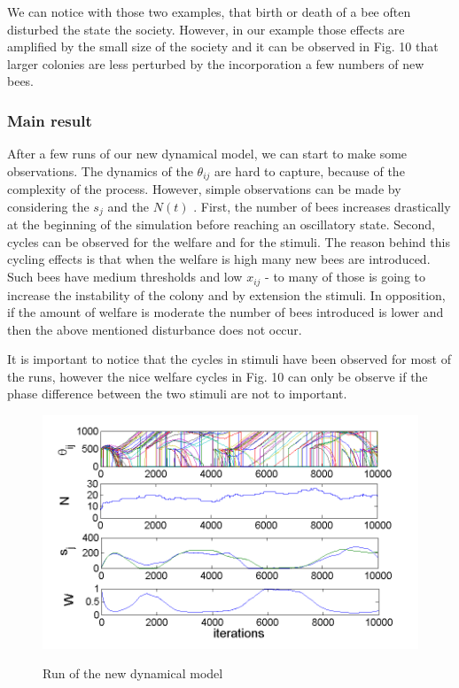 We can notice with those two examples, that birth or death of a bee
often disturbed the state the society. However, in our example those effects are amplified
by the small size of the society and it can be observed in Fig. 10
 that larger colonies are less perturbed by the incorporation a few numbers of
new bees.


\subsubsection{Main result}

After a few runs of our new dynamical model, we can start to make some observations. The dynamics of the $\theta_{ij}$ are hard to capture,
because of the complexity of the process. However, simple observations
can be made by considering the $s_{j}$ and the $N(t)$ . First, the
number of bees increases drastically at the beginning of the simulation
before reaching an oscillatory state. Second, cycles can be observed
for the welfare and for the stimuli. The reason behind this cycling effects is that when
the welfare is high many new bees are introduced. Such bees have medium
thresholds and low $x_{ij}$ - to many of those is going to increase the instability of the colony and by extension the stimuli. In opposition,
if the amount of welfare is moderate the number of bees introduced is lower and then
the above mentioned disturbance does not occur.

It is important to notice that the cycles in stimuli have been
observed for most of the runs, however the nice welfare cycles in Fig. 10 can
only be observe if the phase difference between the two stimuli are not
to important.

\begin{figure}[ht!]
\begin{centering}
\includegraphics[scale=0.8]{figures/Figure6}
\label{fig:figure8}
\par\end{centering}

\begin{centering}
\caption{Run of the new dynamical model}

\par\end{centering}

\end{figure}



